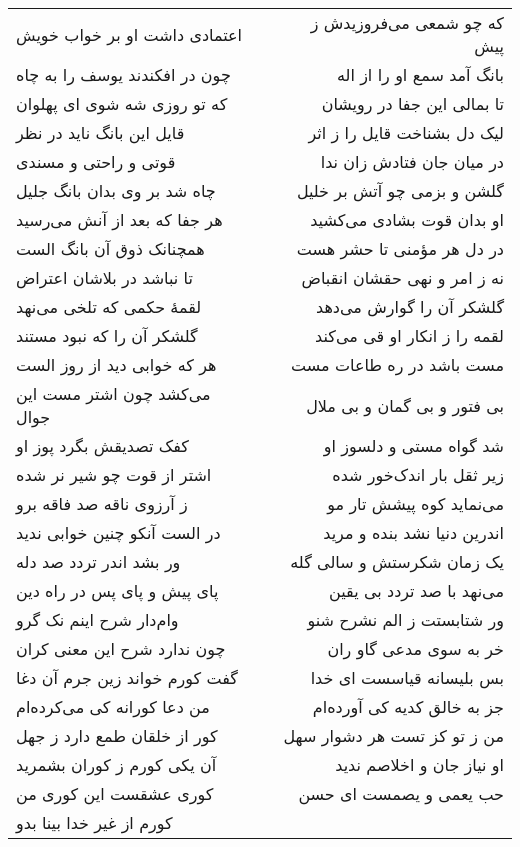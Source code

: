 \begin{center}
\begin{longtable}{l p{0.5cm} r}
اعتمادی داشت او بر خواب خویش
&&
که چو شمعی می‌فروزیدش ز پیش
\\
چون در افکندند یوسف را به چاه
&&
بانگ آمد سمع او را از اله
\\
که تو روزی شه شوی ای پهلوان
&&
تا بمالی این جفا در رویشان
\\
قایل این بانگ ناید در نظر
&&
لیک دل بشناخت قایل را ز اثر
\\
قوتی و راحتی و مسندی
&&
در میان جان فتادش زان ندا
\\
چاه شد بر وی بدان بانگ جلیل
&&
گلشن و بزمی چو آتش بر خلیل
\\
هر جفا که بعد از آنش می‌رسید
&&
او بدان قوت بشادی می‌کشید
\\
همچنانک ذوق آن بانگ الست
&&
در دل هر مؤمنی تا حشر هست
\\
تا نباشد در بلاشان اعتراض
&&
نه ز امر و نهی حقشان انقباض
\\
لقمهٔ حکمی که تلخی می‌نهد
&&
گلشکر آن را گوارش می‌دهد
\\
گلشکر آن را که نبود مستند
&&
لقمه را ز انکار او قی می‌کند
\\
هر که خوابی دید از روز الست
&&
مست باشد در ره طاعات مست
\\
می‌کشد چون اشتر مست این جوال
&&
بی فتور و بی گمان و بی ملال
\\
کفک تصدیقش بگرد پوز او
&&
شد گواه مستی و دلسوز او
\\
اشتر از قوت چو شیر نر شده
&&
زیر ثقل بار اندک‌خور شده
\\
ز آرزوی ناقه صد فاقه برو
&&
می‌نماید کوه پیشش تار مو
\\
در الست آنکو چنین خوابی ندید
&&
اندرین دنیا نشد بنده و مرید
\\
ور بشد اندر تردد صد دله
&&
یک زمان شکرستش و سالی گله
\\
پای پیش و پای پس در راه دین
&&
می‌نهد با صد تردد بی یقین
\\
وام‌دار شرح اینم نک گرو
&&
ور شتابستت ز الم نشرح شنو
\\
چون ندارد شرح این معنی کران
&&
خر به سوی مدعی گاو ران
\\
گفت کورم خواند زین جرم آن دغا
&&
بس بلیسانه قیاسست ای خدا
\\
من دعا کورانه کی می‌کرده‌ام
&&
جز به خالق کدیه کی آورده‌ام
\\
کور از خلقان طمع دارد ز جهل
&&
من ز تو کز تست هر دشوار سهل
\\
آن یکی کورم ز کوران بشمرید
&&
او نیاز جان و اخلاصم ندید
\\
کوری عشقست این کوری من
&&
حب یعمی و یصمست ای حسن
\\
کورم از غیر خدا بینا بدو
&&

\end{longtable}
\end{center}
